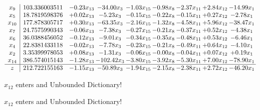 \documentclass[9pt]{article}
\begin{document}
 \[\begin{array}{c| c c@{\hskip 2pt} c@{\hskip 2pt} c@{\hskip 2pt} c@{\hskip 2pt} c@{\hskip 2pt} c@{\hskip 2pt} c@{\hskip 2pt} }
 x_{9}   &  103.336003511 & -0.23 x_{13} & -34.00 x_{3} & -1.03 x_{15} & -0.98 x_{8} & -2.37 x_{11} & +  2.84 x_{12} & -14.99 x_{1}\\
 x_{5}   &  18.7819598376 & +  0.02 x_{13} & -5.23 x_{3} & -0.15 x_{15} & -0.22 x_{8} & -0.15 x_{11} & +  0.27 x_{12} & -2.78 x_{1}\\
 x_{10}   &  177.878305717 & +  0.30 x_{13} & -63.35 x_{3} & -2.16 x_{15} & -1.32 x_{8} & -4.58 x_{11} & +  5.96 x_{12} & -38.47 x_{1}\\
 x_{7}   &  24.7575990343 & -0.06 x_{13} & -7.38 x_{3} & -0.27 x_{15} & -0.21 x_{8} & -0.37 x_{11} & +  0.52 x_{12} & -4.38 x_{1}\\
 x_{6}   &  36.0388456052 & -0.12 x_{13} & -9.01 x_{3} & -0.34 x_{15} & -0.35 x_{8} & -0.48 x_{11} & +  0.53 x_{12} & -6.46 x_{1}\\
 x_{4}   &  22.8381433118 & -0.02 x_{13} & -7.78 x_{3} & -0.23 x_{15} & -0.21 x_{8} & -0.49 x_{11} & +  0.64 x_{12} & -4.10 x_{1}\\
 x_{2}   &  3.35399978053 & +  0.08 x_{13} & -1.31 x_{3} & -0.06 x_{15} & -0.00 x_{8} & -0.04 x_{11} & +  0.07 x_{12} & +  0.19 x_{1}\\
 x_{14}   &  386.574015143 & -1.28 x_{13} & -102.42 x_{3} & -3.80 x_{15} & -3.92 x_{8} & -5.30 x_{11} & +  7.00 x_{12} & -78.90 x_{1}\\
\hline
z    &  212.722155163 & -1.15 x_{13} & -50.89 x_{3} & -1.94 x_{15} & -2.15 x_{8} & -2.38 x_{11} & +  2.72 x_{12} & -46.20 x_{1}\\
\end{array}\]


 $ x_{12} $ enters and Unbounded Dictionary!


 $ x_{12} $ enters and Unbounded Dictionary!
\end{document}
